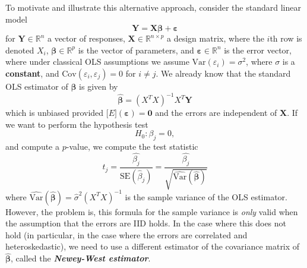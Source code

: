 \documentclass[12pt]{article}
\begin{document}
	To motivate and illustrate this alternative approach, consider the standard linear model $$\mathbf{Y} = \mathbf{X} \boldsymbol{\beta} + \boldsymbol{\varepsilon}$$ for $\mathbf{Y} \in \mathbb{R}^n$ a vector of responses, $\mathbf{X} \in \mathbb{R}^{n \times p}$ a design matrix, where the $i$th row is denoted $X_i$, $\boldsymbol{\beta} \in \mathbb{R}^p$ is the vector of parameters, and $\boldsymbol{\varepsilon} \in \mathbb{R}^n$ is the error vector, where under classical OLS assumptions we assume $\mathrm{Var}(\varepsilon_i) = \sigma^2$, where $\sigma$ is a \textbf{constant}, and $\mathrm{Cov}(\varepsilon_i, \varepsilon_j) = 0$ for $i \neq j$. We already know that the standard OLS estimator of $\boldsymbol \beta$ is given by $$\widehat{\boldsymbol \beta} = (X^T X)^{-1} X^T \mathbf{Y}$$ which is unbiased provided $\mathbb[E](\boldsymbol{\varepsilon}) = \mathbf{0}$ and the errors are independent of $\mathbf{X}$. If we want to perform the hypothesis test $$H_0 : \beta_j = 0,$$ and compute a $p$-value, we compute the test statistic 
	\begin{equation}
		\label{eq:mlsTest}
		t_j = \frac{\widehat{\beta_j}}{\mathrm{SE}(\widehat{\beta}_j)} = \frac{\widehat{\beta_j}}{\sqrt{\widehat{\mathrm{Var}}(\widehat{\boldsymbol \beta})}} 
	\end{equation} 
	where $\widehat{\mathrm{Var}}(\widehat{\boldsymbol \beta}) = \widehat{\sigma}^2 (X^T X)^{-1}$ is the sample variance of the OLS estimator. However, the problem is, this formula for the sample variance is \textit{only} valid when the assumption that the errors are IID holds. In the case where this does not hold (in particular, in the case where the errors are correlated and heteroskedastic), we need to use a different estimator of the covariance matrix of $\widehat{\boldsymbol \beta}$, called the \textbf{\textit{Newey-West estimator}}.
	
\end{document}

